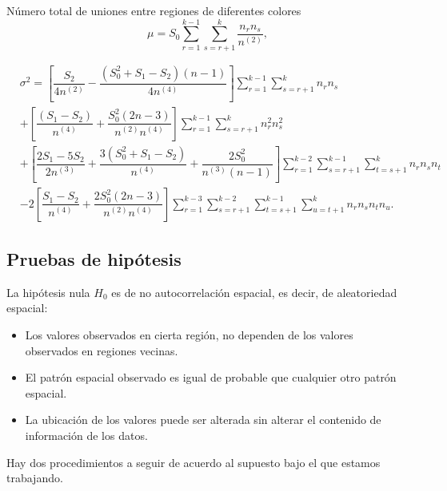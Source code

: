 Número total de uniones entre regiones de diferentes colores
\begin{equation}
\mu = S_0 \sum_{r=1}^{k-1} \sum_{s=r+1}^{k} \dfrac{n_r n_s}{n^{(2)}},
\end{equation}

\begin{align}
&\sigma^2 = \left[ \dfrac{S_2}{4n^{(2)}} - \dfrac{(S_0^2 + S_1 - S_2)(n-1)}{4n^{(4)}} \right]\sum_{r=1}^{k-1} \sum_{s=r+1}^{k} n_r n_s \\ \nonumber
        & + \left[ \dfrac{(S_1 - S_2)}{n^{(4)}} + \dfrac{S_0^2(2n-3)}{n^{(2)}n^{(4)}} \right] \sum_{r=1}^{k-1} \sum_{s=r+1}^{k} n_r^2 n_s^2 \\ \nonumber
        & + \left[ \dfrac{2S_1 - 5S_2}{2n^{(3)}} + \dfrac{3(S_0^2+S_1-S_2)}{n^{(4)}} + \dfrac{2S_0^2}{n^{(3)}(n-1)} \right] \sum_{r=1}^{k-2} \sum_{s=r+1}^{k-1} \sum_{t=s+1}^{k} n_r n_s n_t  \\ \nonumber
        & - 2 \left[ \dfrac{S_1-S_2}{n^{(4)}}+ \dfrac{2S_0^2(2n-3)}{n^{(2)}n^{(4)}} \right]  \sum_{r=1}^{k-3} \sum_{s=r+1}^{k-2} \sum_{t=s+1}^{k-1} \sum_{u=t+1}^{k}n_r n_s n_t n_u . 
\end{align}


\subsection{Pruebas de hipótesis}
La hipótesis nula $H_0$ es de no autocorrelación espacial, es decir, de aleatoriedad espacial:
\begin{itemize}
\item Los valores observados en cierta región, no dependen de los valores observados en regiones vecinas.
\item El patrón espacial observado es igual de probable que cualquier otro patrón espacial.
\item La ubicación de los valores puede ser alterada sin alterar el contenido de información de los datos.
\end{itemize}


Hay dos procedimientos a seguir de acuerdo al supuesto bajo el que estamos trabajando.


